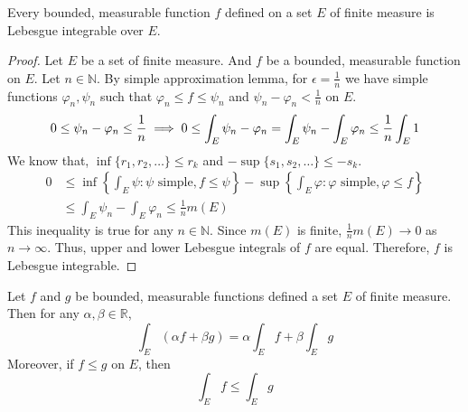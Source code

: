 \begin{theorem}
	Every bounded, measurable function $f$ defined on a set $E$ of finite measure is Lebesgue integrable over $E$.
\end{theorem}
\begin{proof}
	Let $E$ be a set of finite measure.
	And $f$ be a bounded, measurable function on $E$.
	Let $n \in \mathbb{N}$.
	By simple approximation lemma, for $\epsilon = \frac{1}{n}$ we have simple functions $\varphi_n,\psi_n$ such that $\varphi_n \le f \le \psi_n$ and $\psi_n - \varphi_n < \frac{1}{n}$ on $E$.
	\begin{equation*}
		0 \le \psi_n - \varphi_n \le \frac{1}{n} \implies 0 \le \int_E \psi_n - \varphi_n  = \int_E \psi_n - \int_E \varphi_n \le \frac{1}{n} \int_E 1 \\
	\end{equation*}
	We know that, $\inf \{r_1,r_2,\dots\} \le r_k$ and $-\sup\{s_1,s_2,\dots\} \le -s_k$.
	\begin{align*}
		0 & \le \inf \left\{ \int_E \psi : \psi \text{ simple}, f \le \psi \right\} - \sup \left\{ \int_E \varphi : \varphi \text{ simple}, \varphi \le f \right\}\\
		& \le \int_E \psi_n - \int_E \varphi_n \le \frac{1}{n} m(E)
	\end{align*}
	This inequality is true for any $n \in \mathbb{N}$.
	Since $m(E)$ is finite, $\frac{1}{n} m(E) \to 0$ as $n \to \infty$.
	Thus, upper and lower Lebesgue integrals of $f$ are equal.
	Therefore, $f$ is Lebesgue integrable.
\end{proof}
\begin{theorem}
	Let $f$ and $g$ be bounded, measurable functions defined a set $E$ of finite measure.
	Then for any $\alpha,\beta \in \mathbb{R}$,
	\begin{equation}
		\int_E (\alpha f + \beta g) = \alpha \int_E f + \beta \int_E g
	\end{equation}
	Moreover, if $f \le g$ on $E$, then
	\begin{equation}
		\int_E f \le \int_E g
	\end{equation}

\end{theorem}
